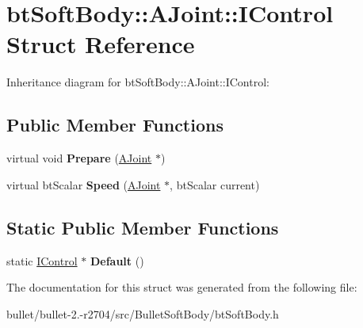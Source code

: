 \hypertarget{structbt_soft_body_1_1_a_joint_1_1_i_control}{\section{bt\+Soft\+Body\+:\+:A\+Joint\+:\+:I\+Control Struct Reference}
\label{structbt_soft_body_1_1_a_joint_1_1_i_control}
}


Inheritance diagram for bt\+Soft\+Body\+:\+:A\+Joint\+:\+:I\+Control\+:
\subsection*{Public Member Functions}
\begin{DoxyCompactItemize}
\item 
\hypertarget{structbt_soft_body_1_1_a_joint_1_1_i_control_a9c58c5d6c02a9c491e7f6a64deacae77}{virtual void {\bfseries Prepare} (\hyperlink{structbt_soft_body_1_1_a_joint}{A\+Joint} $\ast$)}\label{structbt_soft_body_1_1_a_joint_1_1_i_control_a9c58c5d6c02a9c491e7f6a64deacae77}

\item 
\hypertarget{structbt_soft_body_1_1_a_joint_1_1_i_control_a7b37f416825f2c72958c1d619f55e1c1}{virtual bt\+Scalar {\bfseries Speed} (\hyperlink{structbt_soft_body_1_1_a_joint}{A\+Joint} $\ast$, bt\+Scalar current)}\label{structbt_soft_body_1_1_a_joint_1_1_i_control_a7b37f416825f2c72958c1d619f55e1c1}

\end{DoxyCompactItemize}
\subsection*{Static Public Member Functions}
\begin{DoxyCompactItemize}
\item 
\hypertarget{structbt_soft_body_1_1_a_joint_1_1_i_control_aeeea28d1c78df89a9a2fe0c20f66920e}{static \hyperlink{structbt_soft_body_1_1_a_joint_1_1_i_control}{I\+Control} $\ast$ {\bfseries Default} ()}\label{structbt_soft_body_1_1_a_joint_1_1_i_control_aeeea28d1c78df89a9a2fe0c20f66920e}

\end{DoxyCompactItemize}


The documentation for this struct was generated from the following file\+:\begin{DoxyCompactItemize}
\item 
bullet/bullet-\/2.-\/r2704/src/\+Bullet\+Soft\+Body/bt\+Soft\+Body.\+h\end{DoxyCompactItemize}
